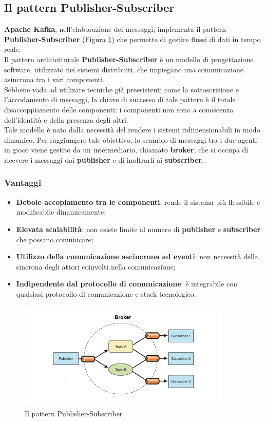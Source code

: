 \subsection{Il pattern Publisher-Subscriber}
\textbf{Apache Kafka}, nell'elaborazione dei messaggi, implementa il pattern \textbf{Publisher-Subscriber} (Figura \ref{fig:publisher_subscriber}) che permette di gestire flussi di dati in tempo reale.\\
Il pattern architetturale \textbf{Publisher-Subscriber} è un modello di progettazione software, utilizzato nei sistemi distribuiti, che impiegano una comunicazione asincrona tra i vari componenti.\\
Sebbene vada ad utilizare tecniche già preesistenti come la sottoscrizione e l'accodamento di messaggi, la  chiave di successo di tale pattern è il totale disaccoppiamento delle componenti: i componenti non sono a conoscenza dell'identità e della presenza degli altri.\\
Tale modello è nato dalla necessità del rendere i sistemi ridimensionabili in modo dinamico. Per raggiungere tale obiettivo, lo scambio di messaggi 
tra i due agenti in gioco viene gestito da un intermediario, chiamato \textbf{broker}, che si occupa di ricevere i messaggi dai \textbf{publisher} e di inoltrarli ai \textbf{subscriber}.\\
\subsubsection{Vantaggi}
\begin{itemize}
    \item \textbf{Debole accopiamento tra le componenti}:  rende il sistema più flessibile e modificabile dinamicamente;
    \item \textbf{Elevata scalabilità}: non esiste limite al numero di \textbf{publisher} e \textbf{subscriber} che possano comunicare;
    \item \textbf{Utilizzo della comunicazione ascincrona ad eventi}: non necessità della sincrona degli attori coinvolti nella comunicazione;
    \item \textbf{Indipendente dal protocollo di comunicazione}: è integrabile con qualsiasi protocollo di comunicazione e stack tecnologico.
\end{itemize}
\begin{figure}[h]
    \centering
    \includegraphics[width=0.9\textwidth]{images/componenti/ps-model.png}
    \caption{Il pattern Publisher-Subscriber}
    \label{fig:publisher_subscriber}
\end{figure}
